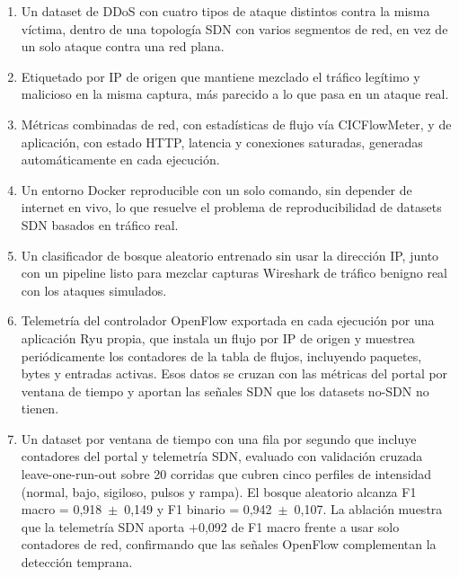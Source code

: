 \documentclass[a4paper,fleqn]{cas-dc}
\begin{document}
\begin{enumerate}[label=\roman*.]
      \item Un dataset de DDoS con cuatro tipos de ataque distintos contra la misma víctima, dentro de una topología SDN con varios segmentos de red, en vez de un solo ataque contra una red plana.

      \item Etiquetado por IP de origen que mantiene mezclado el tráfico legítimo y malicioso en la misma captura, más parecido a lo que pasa en un ataque real.

      \item Métricas combinadas de red, con estadísticas de flujo vía CICFlowMeter, y de aplicación, con estado HTTP, latencia y conexiones saturadas, generadas automáticamente en cada ejecución.

      \item Un entorno Docker reproducible con un solo comando, sin depender de internet en vivo, lo que resuelve el problema de reproducibilidad de datasets SDN basados en tráfico real.

      \item Un clasificador de bosque aleatorio entrenado sin usar la dirección IP, junto con un pipeline listo para mezclar capturas Wireshark de tráfico benigno real con los ataques simulados.

      \item Telemetría del controlador OpenFlow exportada en cada ejecución por una aplicación Ryu propia, que instala un flujo por IP de origen y muestrea periódicamente los contadores de la tabla de flujos, incluyendo paquetes, bytes y entradas activas. Esos datos se cruzan con las métricas del portal por ventana de tiempo y aportan las señales SDN que los datasets no-SDN no tienen.

      \item Un dataset por ventana de tiempo con una fila por segundo que incluye contadores del portal y telemetría SDN, evaluado con validación cruzada leave-one-run-out sobre 20 corridas que cubren cinco perfiles de intensidad (normal, bajo, sigiloso, pulsos y rampa). El bosque aleatorio alcanza F1 macro = 0{,}918~$\pm$~0{,}149 y F1 binario = 0{,}942~$\pm$~0{,}107. La ablación muestra que la telemetría SDN aporta $+$0{,}092 de F1 macro frente a usar solo contadores de red, confirmando que las señales OpenFlow complementan la detección temprana.

\end{enumerate}
\end{document}

